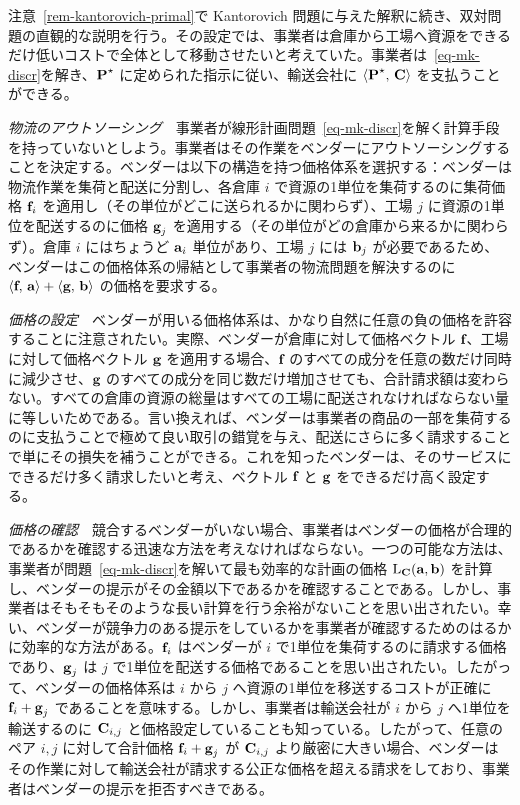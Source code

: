 \begin{rem}\label{rem-kantorovich-dual}
注意~\ref{rem-kantorovich-primal}で Kantorovich 問題に与えた解釈に続き、双対問題の直観的な説明を行う。その設定では、事業者は倉庫から工場へ資源をできるだけ低いコストで全体として移動させたいと考えていた。事業者は~\eqref{eq-mk-discr}を解き、$\P^\star$ に定められた指示に従い、輸送会社に $\dotp{\P^\star}{\C}$ を支払うことができる。

\emph{物流のアウトソーシング}　事業者が線形計画問題~\eqref{eq-mk-discr}を解く計算手段を持っていないとしよう。事業者はその作業をベンダーにアウトソーシングすることを決定する。ベンダーは以下の構造を持つ価格体系を選択する：ベンダーは物流作業を集荷と配送に分割し、各倉庫 $i$ で資源の1単位を集荷するのに集荷価格 $\fD_i$ を適用し（その単位がどこに送られるかに関わらず）、工場 $j$ に資源の1単位を配送するのに価格 $\gD_j$ を適用する（その単位がどの倉庫から来るかに関わらず）。倉庫 $i$ にはちょうど $\a_i$ 単位があり、工場 $j$ には $\b_j$ が必要であるため、ベンダーはこの価格体系の帰結として事業者の物流問題を解決するのに $\dotp{\fD}{\a}+\dotp{\gD}{\b}$ の価格を要求する。

\emph{価格の設定}　ベンダーが用いる価格体系は、かなり自然に任意の負の価格を許容することに注意されたい。実際、ベンダーが倉庫に対して価格ベクトル $\fD$、工場に対して価格ベクトル $\gD$ を適用する場合、$\fD$ のすべての成分を任意の数だけ同時に減少させ、$\gD$ のすべての成分を同じ数だけ増加させても、合計請求額は変わらない。すべての倉庫の資源の総量はすべての工場に配送されなければならない量に等しいためである。言い換えれば、ベンダーは事業者の商品の一部を集荷するのに支払うことで極めて良い取引の錯覚を与え、配送にさらに多く請求することで単にその損失を補うことができる。これを知ったベンダーは、そのサービスにできるだけ多く請求したいと考え、ベクトル $\fD$ と $\gD$ をできるだけ高く設定する。

\emph{価格の確認}　競合するベンダーがいない場合、事業者はベンダーの価格が合理的であるかを確認する迅速な方法を考えなければならない。一つの可能な方法は、事業者が問題~\eqref{eq-mk-discr}を解いて最も効率的な計画の価格 $\MKD_{\C}(\a,\b)$ を計算し、ベンダーの提示がその金額以下であるかを確認することである。しかし、事業者はそもそもそのような長い計算を行う余裕がないことを思い出されたい。幸い、ベンダーが競争力のある提示をしているかを事業者が確認するためのはるかに効率的な方法がある。$\fD_i$ はベンダーが $i$ で1単位を集荷するのに請求する価格であり、$\gD_j$ は $j$ で1単位を配送する価格であることを思い出されたい。したがって、ベンダーの価格体系は $i$ から $j$ へ資源の1単位を移送するコストが正確に $\fD_i+\gD_j$ であることを意味する。しかし、事業者は輸送会社が $i$ から $j$ へ1単位を輸送するのに $\C_{i,j}$ と価格設定していることも知っている。したがって、任意のペア $i,j$ に対して合計価格 $\fD_i+\gD_j$ が $\C_{i,j}$ より厳密に大きい場合、ベンダーはその作業に対して輸送会社が請求する公正な価格を超える請求をしており、事業者はベンダーの提示を拒否すべきである。



\end{rem}

